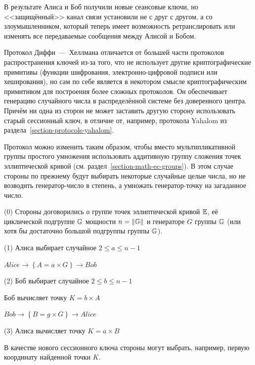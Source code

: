 В результате Алиса и Боб получили новые сеансовые ключи, но <<защищённый>> канал связи установили не с друг с другом, а со злоумышленником, который теперь имеет возможность ретранслировать или изменять все передаваемые сообщения между Алисой и Бобом.

Протокол Диффи~---~Хеллмана отличается от большей части протоколов распространения ключей из-за того, что не использует другие криптографические примитивы (функции шифрования, электронно-цифровой подписи или хеширования), но сам по себе является в некотором смысле криптографическим примитивом для построения более сложных протоколов. Он обеспечивает генерацию случайного числа в распределённой системе без доверенного центра. Причём ни одна из сторон не может заставить другую сторону использовать старый сессионный ключ, в отличие от, например, протокола Yahalom из раздела~\ref{section-protocols-yahalom}.

Протокол можно изменить таким образом, чтобы вместо мультипликативной группы простого умножения использовать аддитивную группу сложения точек эллиптической кривой (см. раздел~\ref{section-math-ec-groups}). В этом случае стороны по прежнему будут выбирать некоторые случайные целые числа, но не возводить генератор-число в степень, а умножать генератор-точку на загаданное число.

\begin{protocol}
    \item[(0)] Стороны договорились о группе точек эллиптической кривой $\mathbb{E}$, её циклической подгруппе $\mathbb{G}$ мощности $n = \| \mathbb{G} \|$ и генераторе $G$ группы $\mathbb{G}$ (или хотя бы достаточно большой подгруппы группы $\mathbb{G}$).
    \item[(1)] Алиса выбирает случайное $2 \leq a \leq n - 1$
    \item[{}] $Alice \to \left\{ A = a \times G \right\} \to Bob$
    \item[(2)] Боб выбирает случайное $2 \leq b \leq n - 1$
    \item[{}] Боб вычисляет точку $K = b \times A$
    \item[{}] $Bob \to \left\{ B = g \times G \right\} \to Alice$
    \item[(3)] Алиса вычисляет точку $K = a \times B$
\end{protocol}

В качестве нового сессионного ключа стороны могут выбрать, например, первую координату найденной точки $K$.


